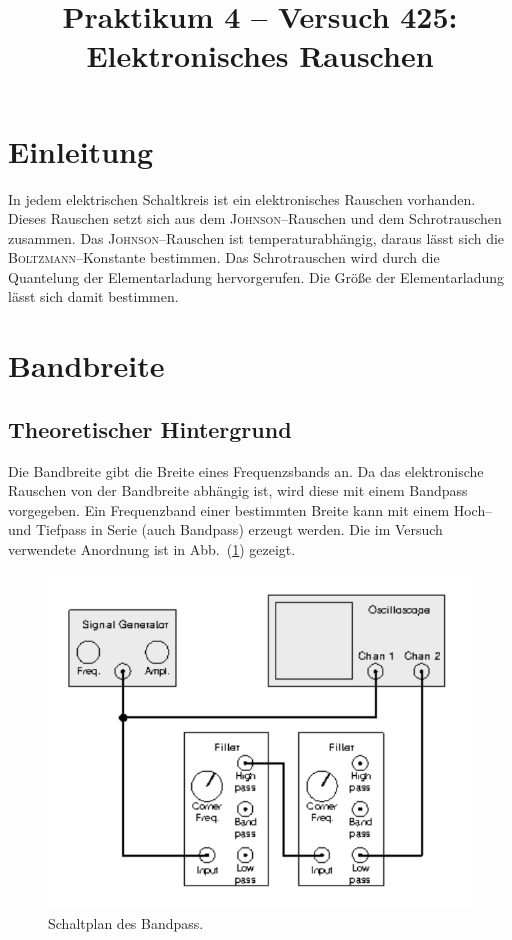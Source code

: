\documentclass[sn-mathphys-num,iicol]{sn-jnl}
\theoremstyle{thmstyleone}
\theoremstyle{thmstyletwo}
\theoremstyle{thmstylethree}
\begin{document}
        
\title[]{Praktikum 4 -- Versuch 425: Elektronisches Rauschen}
\author*[1]{ }
\author*[1]{ }

\maketitle

\section{Einleitung}
In jedem elektrischen Schaltkreis ist ein elektronisches Rauschen vorhanden.
Dieses Rauschen setzt sich aus dem \textsc{Johnson}--Rauschen und dem Schrotrauschen zusammen.
Das \textsc{Johnson}--Rauschen ist temperaturabhängig, daraus lässt sich die \textsc{Boltzmann}--Konstante bestimmen.
Das Schrotrauschen wird durch die Quantelung der Elementarladung hervorgerufen. 
Die Größe der Elementarladung lässt sich damit bestimmen.

\section{Bandbreite}
\subsection{Theoretischer Hintergrund}
Die Bandbreite gibt die Breite eines Frequenzsbands an.
Da das elektronische Rauschen von der Bandbreite abhängig ist, wird diese mit einem Bandpass vorgegeben.
Ein Frequenzband einer bestimmten Breite kann mit einem Hoch-- und Tiefpass in Serie (auch Bandpass) erzeugt werden.
Die im Versuch verwendete Anordnung ist in Abb.\ (\ref{fig:schaltplan_bandpass}) gezeigt.

\begin{figure}[t]
        \centering
        \includegraphics[width=.5\textwidth]{425_schaltplan_bandpass.png}
        \caption{Schaltplan des Bandpass.\cite{anleitung425}} \label{fig:schaltplan_bandpass}
\end{figure}
\end{document}
